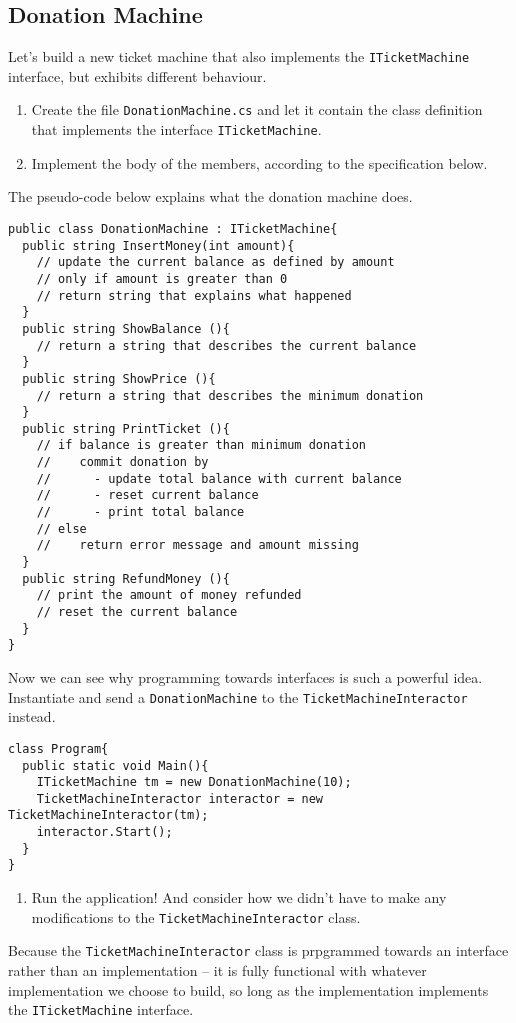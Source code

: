 \documentclass{article}
\newcounter{stepcounter}
\newenvironment{steps}{ 
  \begin{enumerate}[label=\color{red}Step \thesection-\theenumi)]
    \setcounter{enumi}{\value{stepcounter}}
}{
  \setcounter{stepcounter}{\value{enumi}}
  \end{enumerate}
}
\begin{document}
\subsection{Donation Machine}
Let's build a new ticket machine that also implements the \texttt{ITicketMachine} interface, but exhibits different behaviour.
\begin{steps}
\item Create the file \texttt{DonationMachine.cs} and let it contain the class definition that implements the interface \texttt{ITicketMachine}.
\item Implement the body of the members, according to the specification below.
\end{steps}
The pseudo-code below explains what the donation machine does.
\begin{lstlisting}
public class DonationMachine : ITicketMachine{
  public string InsertMoney(int amount){
    // update the current balance as defined by amount
    // only if amount is greater than 0
    // return string that explains what happened
  }
  public string ShowBalance (){
    // return a string that describes the current balance
  }
  public string ShowPrice (){
    // return a string that describes the minimum donation
  }
  public string PrintTicket (){
    // if balance is greater than minimum donation
    //    commit donation by
    //      - update total balance with current balance
    //      - reset current balance
    //      - print total balance
    // else
    //    return error message and amount missing
  }
  public string RefundMoney (){
    // print the amount of money refunded
    // reset the current balance
  }
}
\end{lstlisting}
Now we can see why programming towards interfaces is such a powerful idea. Instantiate and send a \texttt{DonationMachine} to the \texttt{TicketMachineInteractor} instead.
\begin{lstlisting}
class Program{
  public static void Main(){
    ITicketMachine tm = new DonationMachine(10);
    TicketMachineInteractor interactor = new TicketMachineInteractor(tm);
    interactor.Start();
  }
}
\end{lstlisting}
\begin{steps}
\item Run the application! And consider how we didn't have to make any modifications to the \texttt{TicketMachineInteractor} class.
\end{steps}
Because the \texttt{TicketMachineInteractor} class is prpgrammed towards an interface rather than an implementation -- it is fully functional with whatever implementation we choose to build, so long as the implementation implements the \texttt{ITicketMachine} interface.
\end{document}
